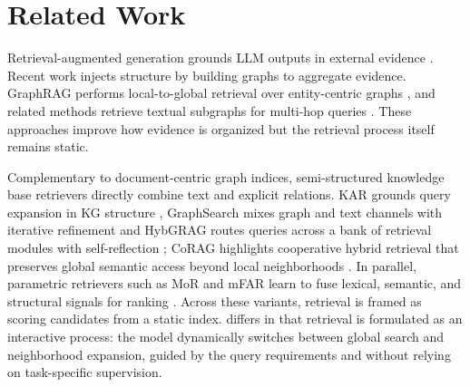 
\section{Related Work}
\label{sec:related}

Retrieval-augmented generation grounds LLM outputs in external evidence \cite{lewis_retrieval-augmented_2020,guu_realm_2020}. Recent work injects structure by building graphs to aggregate evidence. GraphRAG performs local-to-global retrieval over entity-centric graphs \cite{edge_local_2025}, and related methods retrieve textual subgraphs for multi-hop queries \cite{zhu_knowledge_2025,hu_grag_2025,he_g-retriever_2024,li_simple_2025}. These approaches improve how evidence is organized but the retrieval process itself remains static.

Complementary to document-centric graph indices, semi-structured knowledge base retrievers directly combine text and explicit relations. KAR grounds query expansion in KG structure \cite{xia_knowledge-aware_2025}, GraphSearch mixes graph and text channels with iterative refinement \cite{yang_graphsearch_2025} and HybGRAG routes queries across a bank of retrieval modules with self-reflection \cite{lee_hybgrag_2025}; CoRAG highlights cooperative hybrid retrieval that preserves global semantic access beyond local neighborhoods \cite{zheng_corag_2025}. In parallel, parametric retrievers such as MoR and mFAR learn to fuse lexical, semantic, and structural signals for ranking \cite{lei_mixture_2025,li_multi-field_2025}. Across these variants, retrieval is framed as scoring candidates from a static index. \retrieverShort differs in that retrieval is formulated as an interactive process: the model dynamically switches between global search and neighborhood expansion, guided by the query requirements and without relying on task-specific supervision.

